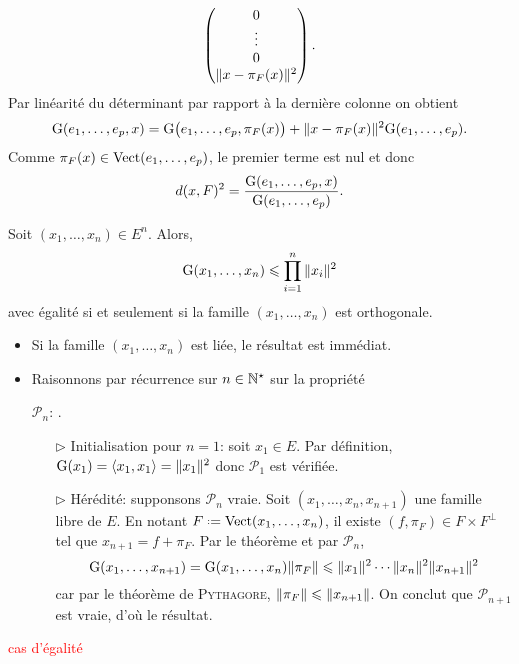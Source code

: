\begin{preuve}
{$$        \begin{pmatrix}
            0 \\
            \vdots \\
            0 \\
            \Vert x - \pi_F(x) \Vert^2
        \end{pmatrix}.
        $$
    }
    Par linéarité du déterminant par rapport à la dernière colonne \note on obtient
    $$\mathrm{G}(e_1, \dots, e_p, x) = \mathrm{G} \big(e_1, \dots, e_p, \pi_F(x) \big) + \Vert x - \pi_F(x) \Vert^2 \mathrm{G}(e_1, \dots, e_p).$$
    Comme $\pi_F(x) \in \mathrm{Vect}(e_1, \dots, e_p)$, le premier terme est nul et donc 
    $$d(x, F)^2 = \frac{\mathrm{G}(e_1, \dots, e_p, x)}{\mathrm{G}(e_1, \dots, e_p)}.$$
\end{preuve}

\begin{corol} 
    Soit $(x_1, \dots, x_n) \in E^n$. Alors,
    $$\mathrm{G}(x_1, \dots, x_n) \leqslant \prod_{i=1}^n \Vert x_i \Vert^2$$
    avec égalité si et seulement si la famille $(x_1, \dots, x_n)$ est orthogonale. 
\end{corol}

\begin{preuve}
    \begin{itemize}
        \item Si la famille $(x_1, \dots, x_n)$ est liée, le résultat est immédiat.
        \item Raisonnons par récurrence sur $n \in \mathbb{N}^\star$ sur la propriété
        \begin{center}
            $\mathscr{P}_n$: .
        \end{center}
        \begin{itemize}
            \item[$\rhd$] Initialisation pour $n = 1$: soit $x_1 \in E$. Par définition, $\mathrm{G}(x_1) = \langle x_1, x_1 \rangle = \Vert x_1 \Vert^2$ donc $\mathscr{P}_1$ est vérifiée.
            \item[$\rhd$] Hérédité: supponsons $\mathscr{P}_n$ vraie. Soit $(x_1, \dots, x_n, x_{n+1})$ une famille libre de $E$. En notant $F \defeq \Vect(x_1, \dots, x_n)$, il existe $(f, \pi_F) \in F \times F^\perp$ tel que $x_{n+1} = f + \pi_F$. Par le théorème  et par $\mathscr{P}_n$, 
            $$\mathrm{G}(x_1, \dots, x_{n+1}) = \mathrm{G}(x_1, \dots, x_n) \Vert \pi_F \Vert \leqslant \Vert x_1 \Vert^2 \cdots \Vert x_n \Vert^2 \Vert x_{n+1} \Vert^2$$
            car par le théorème de \textsc{Pythagore}, $\Vert \pi_F \Vert \leqslant \Vert x_{n+1} \Vert$. On conclut que $\mathscr{P}_{n+1}$ est vraie, d'où le résultat. 
        \end{itemize}
    \end{itemize}
    \textcolor{red}{cas d'égalité}
\end{preuve}

